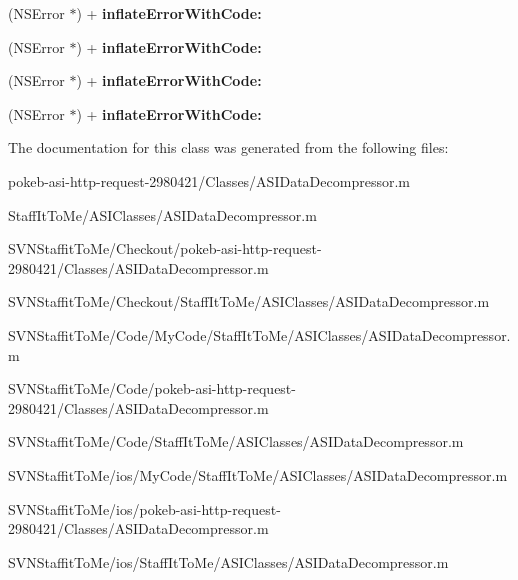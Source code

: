 \begin{DoxyCompactItemize}
\item 
\hypertarget{interface_a_s_i_data_decompressor_07_08_af9f7937d26855a8efc23746814706011}{
(\-N\-S\-Error $\ast$) + {\bfseries inflate\-Error\-With\-Code\-:}}
\label{interface_a_s_i_data_decompressor_07_08_af9f7937d26855a8efc23746814706011}

\item 
\hypertarget{interface_a_s_i_data_decompressor_07_08_af9f7937d26855a8efc23746814706011}{
(\-N\-S\-Error $\ast$) + {\bfseries inflate\-Error\-With\-Code\-:}}
\label{interface_a_s_i_data_decompressor_07_08_af9f7937d26855a8efc23746814706011}

\item 
\hypertarget{interface_a_s_i_data_decompressor_07_08_af9f7937d26855a8efc23746814706011}{
(\-N\-S\-Error $\ast$) + {\bfseries inflate\-Error\-With\-Code\-:}}
\label{interface_a_s_i_data_decompressor_07_08_af9f7937d26855a8efc23746814706011}

\item 
\hypertarget{interface_a_s_i_data_decompressor_07_08_af9f7937d26855a8efc23746814706011}{
(\-N\-S\-Error $\ast$) + {\bfseries inflate\-Error\-With\-Code\-:}}
\label{interface_a_s_i_data_decompressor_07_08_af9f7937d26855a8efc23746814706011}

\end{DoxyCompactItemize}


\-The documentation for this class was generated from the following files\-:\begin{DoxyCompactItemize}
\item 
pokeb-\/asi-\/http-\/request-\/2980421/\-Classes/\-A\-S\-I\-Data\-Decompressor.\-m\item 
\-Staff\-It\-To\-Me/\-A\-S\-I\-Classes/\-A\-S\-I\-Data\-Decompressor.\-m\item 
\-S\-V\-N\-Staffit\-To\-Me/\-Checkout/pokeb-\/asi-\/http-\/request-\/2980421/\-Classes/\-A\-S\-I\-Data\-Decompressor.\-m\item 
\-S\-V\-N\-Staffit\-To\-Me/\-Checkout/\-Staff\-It\-To\-Me/\-A\-S\-I\-Classes/\-A\-S\-I\-Data\-Decompressor.\-m\item 
\-S\-V\-N\-Staffit\-To\-Me/\-Code/\-My\-Code/\-Staff\-It\-To\-Me/\-A\-S\-I\-Classes/\-A\-S\-I\-Data\-Decompressor.\-m\item 
\-S\-V\-N\-Staffit\-To\-Me/\-Code/pokeb-\/asi-\/http-\/request-\/2980421/\-Classes/\-A\-S\-I\-Data\-Decompressor.\-m\item 
\-S\-V\-N\-Staffit\-To\-Me/\-Code/\-Staff\-It\-To\-Me/\-A\-S\-I\-Classes/\-A\-S\-I\-Data\-Decompressor.\-m\item 
\-S\-V\-N\-Staffit\-To\-Me/ios/\-My\-Code/\-Staff\-It\-To\-Me/\-A\-S\-I\-Classes/\-A\-S\-I\-Data\-Decompressor.\-m\item 
\-S\-V\-N\-Staffit\-To\-Me/ios/pokeb-\/asi-\/http-\/request-\/2980421/\-Classes/\-A\-S\-I\-Data\-Decompressor.\-m\item 
\-S\-V\-N\-Staffit\-To\-Me/ios/\-Staff\-It\-To\-Me/\-A\-S\-I\-Classes/\-A\-S\-I\-Data\-Decompressor.\-m\end{DoxyCompactItemize}
